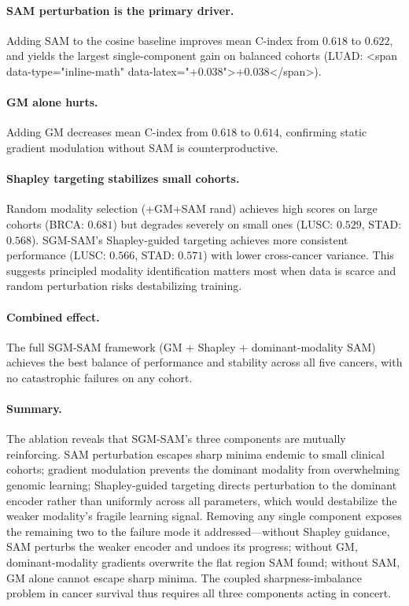 \documentclass[10pt]{article}\usepackage[utf8]{inputenc}\usepackage[T1]{fontenc}\usepackage{amsmath,amssymb,amsfonts,bm}\usepackage{booktabs}\usepackage{multirow}\usepackage{array}\usepackage{graphicx}\usepackage{algorithm}\usepackage{algorithmic}\usepackage{xcolor}\usepackage[margin=1in]{geometry}\usepackage{microtype}
\begin{document}
\paragraph{SAM perturbation is the primary driver.} Adding SAM to the cosine baseline improves mean C-index from $0.618$ to $0.622$, and yields the largest single-component gain on balanced cohorts (LUAD: <span data-type="inline-math" data-latex="+0.038">+0.038</span>).

\paragraph{GM alone hurts.} Adding GM decreases mean C-index from $0.618$ to $0.614$, confirming static gradient modulation without SAM is counterproductive.

\paragraph{Shapley targeting stabilizes small cohorts.} Random modality selection (+GM+SAM rand) achieves high scores on large cohorts (BRCA: $0.681$) but degrades severely on small ones (LUSC: $0.529$, STAD: $0.568$). SGM-SAM's Shapley-guided targeting achieves more consistent performance (LUSC: $0.566$, STAD: $0.571$) with lower cross-cancer variance. This suggests principled modality identification matters most when data is scarce and random perturbation risks destabilizing training.

\paragraph{Combined effect.} The full SGM-SAM framework (GM + Shapley + dominant-modality SAM) achieves the best balance of performance and stability across all five cancers, with no catastrophic failures on any cohort.

\paragraph{Summary.} The ablation reveals that SGM-SAM's three components are mutually reinforcing. SAM perturbation escapes sharp minima endemic to small clinical cohorts; gradient modulation prevents the dominant modality from overwhelming genomic learning; Shapley-guided targeting directs perturbation to the dominant encoder rather than uniformly across all parameters, which would destabilize the weaker modality's fragile learning signal. Removing any single component exposes the remaining two to the failure mode it addressed---without Shapley guidance, SAM perturbs the weaker encoder and undoes its progress; without GM, dominant-modality gradients overwrite the flat region SAM found; without SAM, GM alone cannot escape sharp minima. The coupled sharpness-imbalance problem in cancer survival thus requires all three components acting in concert.
\end{document}
